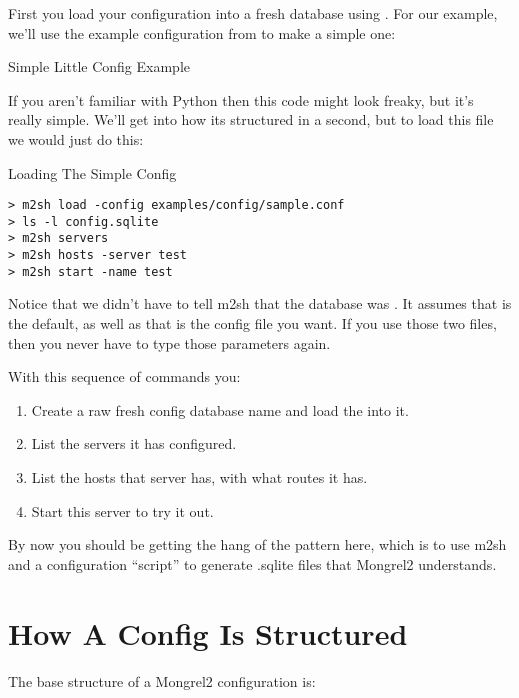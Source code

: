 First you load your configuration into a fresh database using .  For our example, we'll use the example configuration from
 to make a simple one:

\begin{code}{Simple Little Config Example}
  
\end{code}

If you aren't familiar with Python then this code might look freaky, but it's really
simple.  We'll get into how its structured in a second, but to load this file
we would just do this:

\begin{code}{Loading The Simple Config}
\begin{lstlisting}
> m2sh load -config examples/config/sample.conf
> ls -l config.sqlite
> m2sh servers
> m2sh hosts -server test
> m2sh start -name test
\end{lstlisting}
\end{code}

Notice that we didn't have to tell m2sh that the database was .
It assumes that is the default, as well as that  is the config
file you want.  If you use those two files, then you never have to type those
parameters again.

With this sequence of commands you:

\begin{enumerate}
\item Create a raw fresh config database name  and load the  into it.
\item List the servers it has configured.
\item List the hosts that server has, with what routes it has.
\item Start this server to try it out.
\end{enumerate}

By now you should be getting the hang of the pattern here, which is to use
m2sh and a configuration ``script'' to generate .sqlite files
that Mongrel2 understands.

\section{How A Config Is Structured}

The base structure of a Mongrel2 configuration is:

